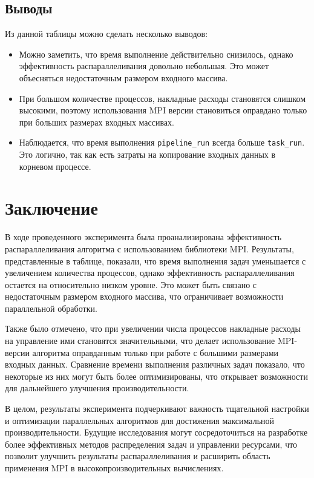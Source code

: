 \documentclass[12pt]{article}
\begin{document}
\subsection{Выводы}
Из данной таблицы можно сделать несколько выводов:
\begin{itemize}
    \item Можно заметить, что время выполнение действительно снизилось, однако эффективность распараллеливания довольно небольшая. Это может объесняться недостаточным размером входного массива.
    \item При большом количестве процессов, накладные расходы становятся слишком высокими, поэтому использования MPI версии становиться оправдано только при больших размерах входных массивах. 
    \item Наблюдается, что время выполнения \texttt{pipeline\_run} всегда больше \texttt{task\_run}. Это логично, так как есть затраты на копирование входных данных в корневом процессе.
\end{itemize}

\newpage
\section*{Заключение}
В ходе проведенного эксперимента была проанализирована эффективность распараллеливания алгоритма с использованием библиотеки MPI. Результаты, представленные в таблице, показали, что время выполнения задач уменьшается с увеличением количества процессов, однако эффективность распараллеливания остается на относительно низком уровне. Это может быть связано с недостаточным размером входного массива, что ограничивает возможности параллельной обработки.

Также было отмечено, что при увеличении числа процессов накладные расходы на управление ими становятся значительными, что делает использование MPI-версии алгоритма оправданным только при работе с большими размерами входных данных. Сравнение времени выполнения различных задач показало, что некоторые из них могут быть более оптимизированы, что открывает возможности для дальнейшего улучшения производительности.

В целом, результаты эксперимента подчеркивают важность тщательной настройки и оптимизации параллельных алгоритмов для достижения максимальной производительности. Будущие исследования могут сосредоточиться на разработке более эффективных методов распределения задач и управлении ресурсами, что позволит улучшить результаты распараллеливания и расширить область применения MPI в высокопроизводительных вычислениях.
\end{document}
